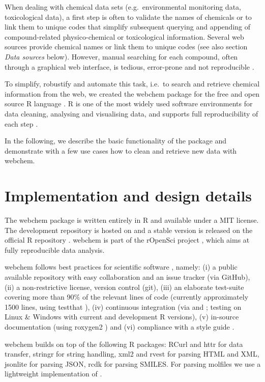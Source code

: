 When dealing with chemical data sets (e.g.\ environmental monitoring data, toxicological data), a first step is often to validate the names of chemicals or to link them to unique codes that simplify subsequent querying and appending of compound-related physico-chemical or toxicological information.
Several web sources provide chemical names or link them to unique codes (see also section \emph{Data sources} below).
However, manual searching for each compound, often through a graphical web interface, is tedious, error-prone and not reproducible \citep{Peng_2009}.

To simplify, robustify and automate this task, i.e.\ to search and retrieve chemical information from the web, we created the webchem package for the free and open source R language \citep{r_2015, Wehrens_2011}.
R is one of the most widely used software environments for data cleaning, analysing and visualising data, and supports full reproducibility of each step \citep{Marwick_2016}.

In the following, we describe the basic functionality of the package and demonstrate with a few use cases how to clean and retrieve new data with webchem.


\section[Implementation and design details]{Implementation and design details}
The webchem package is written entirely in R and available under a MIT license.
The development repository is hosted on \citet{github} and a stable version is released on the official R repository \citep{cran}.
webchem is part of the rOpenSci project \citep{boettiger2015building}, which aims at fully reproducible data analysis.

webchem follows best practices for scientific software \citep{wilson_best_2014, poisot_best_2015}, namely: (i) a public available repository with easy collaboration and an issue tracker (via GitHub), (ii) a non-restrictive license, version control (git), (iii) an elaborate test-suite covering more than 90\% of the relevant lines of code (currently approximately 1500 lines, using testthat \citep{wickham_testthat:_2011}), (iv) continuous integration (via \citet{travis-ci} and \citet{appveyor}; testing on Linux \& Windows with current and development R versions), (v) in-source documentation (using roxygen2 \citep{wickham_roxygen2:_2015}) and (vi) compliance with a style guide \citep{wickham_advanced_2015}.

webchem builds on top of the following R packages:
RCurl \citep{lang_rcurl:_2015} and httr \citep{wickham_httr} for data transfer,
stringr \citep{wickham_stringr:_2015} for string handling,
xml2 \citep{wickham_xml2} and rvest \citep{wickham_rvest} for parsing HTML and XML,
jsonlite \citep{ooms_jsonlite_2014} for parsing JSON,
rcdk \citep{guha_rcdk} for parsing SMILES.
For parsing molfiles we use a lightweight implementation of \citet{Grabner_Varmuza_Dehmer_2012}.

